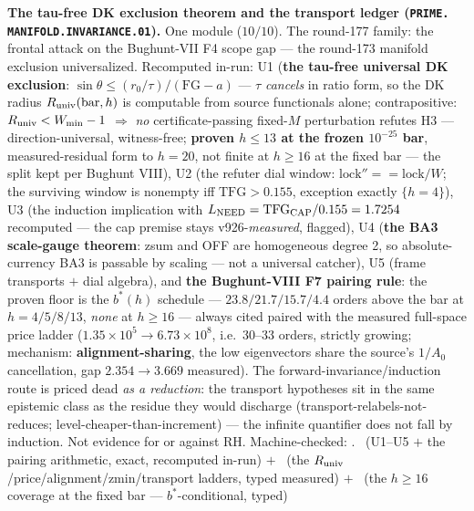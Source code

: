 \documentclass[11pt,a4paper]{article}
\theoremstyle{definition}
\begin{document}
\par\smallskip\noindent\textbf{The tau-free DK exclusion theorem
and the transport ledger (\texttt{PRIME.\allowbreak
MANIFOLD.\allowbreak INVARIANCE.01}).}
One module ($10/10$).  The round-177 family: the frontal attack on
the Bughunt-VII F4 scope gap --- the round-173 manifold exclusion
universalized.  Recomputed in-run: U1 (\textbf{the tau-free
universal DK exclusion}: $\sin\theta \le (r_0/\tau)/(\mathrm{FG} -
a)$ --- $\tau$ \emph{cancels} in ratio form, so the DK radius
$R_{\rm univ}(\mathrm{bar}, h)$ is computable from source
functionals alone; contrapositive: $R_{\rm univ} < W_{\min} - 1$
$\Rightarrow$ \emph{no} certificate-passing fixed-$M$ perturbation
refutes H3 --- direction-universal, witness-free; \textbf{proven
$h \le 13$ at the frozen $10^{-25}$ bar}, measured-residual form
to $h = 20$, not finite at $h \ge 16$ at the fixed bar --- the
split kept per Bughunt VIII), U2 (the refuter dial window:
$\mathrm{lock}'' == \mathrm{lock}/W$; the surviving window is
nonempty iff $\mathrm{TFG} > 0.155$, exception exactly $\{h =
4\}$), U3 (the induction implication with $L_{\rm NEED} =
\mathrm{TFG}_{\rm CAP}/0.155 = 1.7254$ recomputed --- the cap
premise stays v926-\emph{measured}, flagged), U4 (\textbf{the BA3
scale-gauge theorem}: zsum and OFF are homogeneous degree 2, so
absolute-currency BA3 is passable by scaling --- not a universal
catcher), U5 (frame transports $+$ dial algebra), and \textbf{the
Bughunt-VIII F7 pairing rule}: the proven floor is the $b^*(h)$
schedule --- $23.8/21.7/15.7/4.4$ orders above the bar at $h =
4/5/8/13$, \emph{none} at $h \ge 16$ --- always cited paired with
the measured full-space price ladder ($1.35\times10^{5} \to
6.73\times10^{8}$, i.e.\ 30--33 orders, strictly growing;
mechanism: \textbf{alignment-sharing}, the low eigenvectors share
the source's $1/A_0$ cancellation, gap $2.354 \to 3.669$
measured).  The forward-invariance/induction route is priced dead
\emph{as a reduction}: the transport hypotheses sit in the same
epistemic class as the residue they would discharge
(transport-relabels-not-reduces; level-cheaper-than-increment) ---
the infinite quantifier does not fall by induction.  Not evidence
for or against RH.
Machine-checked: .
\mE\ (U1--U5 $+$ the pairing arithmetic, exact, recomputed in-run)
$+$ \mC\ (the $R_{\rm univ}$/price/alignment/zmin/transport
ladders, typed measured) $+$ \mO\ (the $h \ge 16$ coverage at the
fixed bar --- $b^*$-conditional, typed)
\par\smallskip
\end{document}
